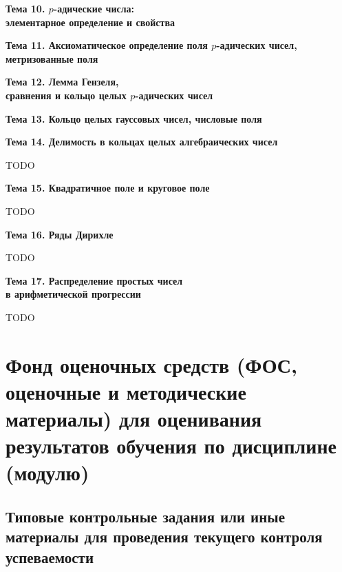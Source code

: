 \documentclass[a4paper, 12pt]{article}
\begin{document}
\begin{center} {\bf Тема 10. $p$-адические числа:\\ элементарное определение и свойства} \end{center}



\begin{center} {\bf Тема 11. Аксиоматическое определение поля $p$-адических чисел,\\ метризованные поля} \end{center}



\begin{center} {\bf Тема 12. Лемма Гензеля,\\ сравнения и кольцо целых $p$-адических чисел} \end{center}



\begin{center} {\bf Тема 13. Кольцо целых гауссовых чисел, числовые поля} \end{center}



\begin{center} {\bf Тема 14. Делимость в кольцах целых алгебраических чисел} \end{center} TODO
\begin{center} {\bf Тема 15. Квадратичное поле и круговое поле} \end{center} TODO

\begin{center} {\bf Тема 16. Ряды Дирихле} \end{center} TODO
\begin{center} {\bf Тема 17. Распределение простых чисел\\ в арифметической прогрессии} \end{center} TODO

\section{Фонд оценочных средств (ФОС, оценочные и методические материалы) для оценивания результатов обучения по дисциплине (модулю)}

\subsection{Типовые контрольные задания или иные материалы для проведения текущего контроля успеваемости}
\end{document}
